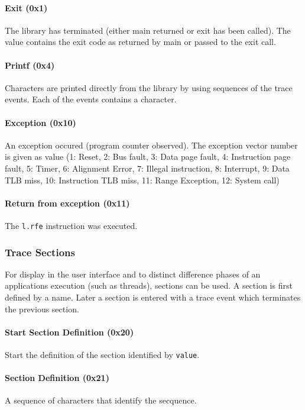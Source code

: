 \paragraph{Exit (0x1)} The library has terminated (either main
returned or exit has been called). The value contains the exit code as
returned by main or passed to the exit call.

\paragraph{Printf (0x4)} Characters are printed directly from the
library by using sequences of the trace events. Each of the events
contains a character.

\paragraph{Exception (0x10)} An exception occured (program counter
observed). The exception vector number is given as value (1: Reset, 2:
Bus fault, 3: Data page fault, 4: Instruction page fault, 5: Timer, 6:
Alignment Error, 7: Illegal instruction, 8: Interrupt, 9: Data TLB
miss, 10: Instruction TLB miss, 11: Range Exception, 12: System call)

\paragraph{Return from exception (0x11)} The \verb|l.rfe| instruction
was executed.

\subsubsection{Trace Sections}

For display in the user interface and to distinct difference phases of
an applications execution (such as threads), sections can be used. A
section is first defined by a name. Later a section is entered with a
trace event which terminates the previous section.

\paragraph{Start Section Definition (0x20)} Start the definition of
the section identified by \verb|value|.

\paragraph{Section Definition (0x21)} A sequence of characters that
identify the secquence.

